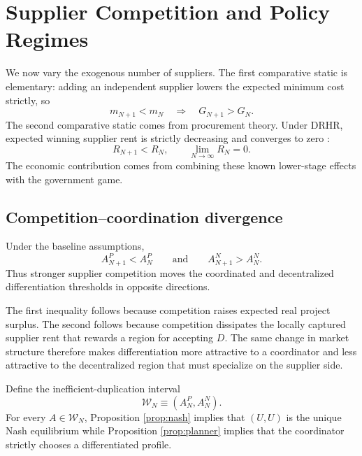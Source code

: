 \section{Supplier Competition and Policy Regimes}
\label{sec:main-results}

We now vary the exogenous number of suppliers. The first comparative static is elementary: adding an independent supplier lowers the expected minimum cost strictly, so
\begin{equation}
m_{N+1}<m_N
\quad\Longrightarrow\quad
G_{N+1}>G_N.
\label{eq:G-increase}
\end{equation}
The second comparative static comes from procurement theory. Under DRHR, expected winning supplier rent is strictly decreasing and converges to zero \citep{Li2005,XuLi2019}:
\begin{equation}
R_{N+1}<R_N,
\qquad
\lim_{N\to\infty}R_N=0.
\label{eq:R-decrease}
\end{equation}
The economic contribution comes from combining these known lower-stage effects with the government game.

\subsection{Competition--coordination divergence}

\begin{theorem}
\label{thm:divergence}
Under the baseline assumptions,
\begin{equation}
A_{N+1}^P<A_N^P
\qquad\text{and}\qquad
A_{N+1}^N>A_N^N.
\label{eq:opposite-thresholds}
\end{equation}
Thus stronger supplier competition moves the coordinated and decentralized differentiation thresholds in opposite directions.
\end{theorem}

The first inequality follows because competition raises expected real project surplus. The second follows because competition dissipates the locally captured supplier rent that rewards a region for accepting $D$. The same change in market structure therefore makes differentiation more attractive to a coordinator and less attractive to the decentralized region that must specialize on the supplier side.

Define the inefficient-duplication interval
\begin{equation}
\mathcal W_N\equiv(A_N^P,A_N^N).
\label{eq:wedgeN}
\end{equation}
For every $A\in\mathcal W_N$, Proposition \ref{prop:nash} implies that $(U,U)$ is the unique Nash equilibrium while Proposition \ref{prop:planner} implies that the coordinator strictly chooses a differentiated profile.

